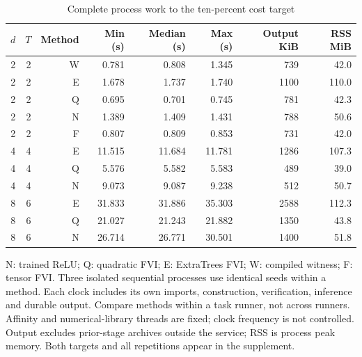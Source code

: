 \begin{table}[htbp]
\centering
\caption{Complete process work to the ten-percent cost target}\label{tab:timing56}
{\small\setlength{\tabcolsep}{4pt}
\begin{tabular}{rrrrrrrr}
\toprule
$d$ & $T$ & Method & Min (s) & Median (s) & Max (s) & Output KiB & RSS MiB \\
\midrule
2 & 2 & W & 0.781 & 0.808 & 1.345 & 739 & 42.0 \\
2 & 2 & E & 1.678 & 1.737 & 1.740 & 1100 & 110.0 \\
2 & 2 & Q & 0.695 & 0.701 & 0.745 & 781 & 42.3 \\
2 & 2 & N & 1.389 & 1.409 & 1.431 & 788 & 50.6 \\
2 & 2 & F & 0.807 & 0.809 & 0.853 & 731 & 42.0 \\
4 & 4 & E & 11.515 & 11.684 & 11.781 & 1286 & 107.3 \\
4 & 4 & Q & 5.576 & 5.582 & 5.583 & 489 & 39.0 \\
4 & 4 & N & 9.073 & 9.087 & 9.238 & 512 & 50.7 \\
8 & 6 & E & 31.833 & 31.886 & 35.303 & 2588 & 112.3 \\
8 & 6 & Q & 21.027 & 21.243 & 21.882 & 1350 & 43.8 \\
8 & 6 & N & 26.714 & 26.771 & 30.501 & 1400 & 51.8 \\
\bottomrule
\end{tabular}}
\par\smallskip
{\footnotesize N: trained ReLU; Q: quadratic FVI; E: ExtraTrees FVI; W: compiled witness; F: tensor FVI. Three isolated sequential processes use identical seeds within a method. Each clock includes its own imports, construction, verification, inference and durable output. Compare methods within a task runner, not across runners. Affinity and numerical-library threads are fixed; clock frequency is not controlled. Output excludes prior-stage archives outside the service; RSS is process peak memory. Both targets and all repetitions appear in the supplement.}
\end{table}
